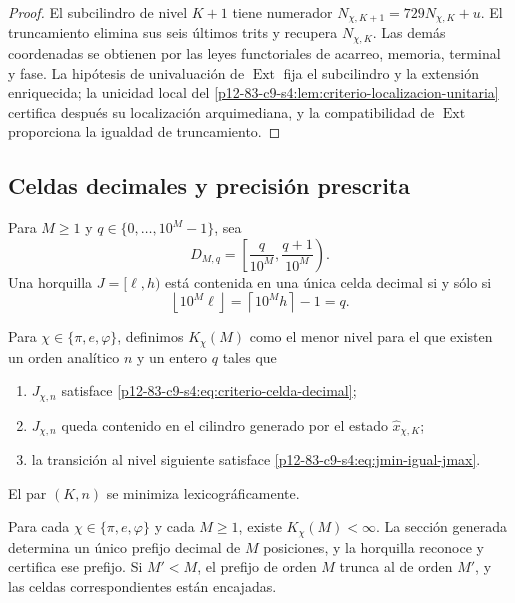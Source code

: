 \begin{proof}
El subcilindro de nivel \(K+1\) tiene numerador
\(N_{\chi,K+1}=729N_{\chi,K}+u\). El truncamiento elimina sus seis últimos
trits y recupera \(N_{\chi,K}\). Las demás coordenadas se obtienen por las
leyes functoriales de acarreo, memoria, terminal y fase. La hipótesis de
univaluación de \(\operatorname{Ext}\) fija el subcilindro y la extensión
enriquecida; la unicidad local del
\cref{p12-83-c9-s4:lem:criterio-localizacion-unitaria} certifica después su
localización arquimediana, y la compatibilidad de \(\operatorname{Ext}\)
proporciona la igualdad de truncamiento.
\end{proof}

\subsection{Celdas decimales y precisión prescrita}

Para \(M\geq1\) y \(q\in\{0,\ldots,10^M-1\}\), sea
\[
 D_{M,q}=
 \left[
 \frac{q}{10^M},
 \frac{q+1}{10^M}
 \right).
\]
Una horquilla \(J=[\ell,h)\) está contenida en una única celda decimal si
y sólo si
\begin{equation}
 \boxed{
 \left\lfloor10^M\ell\right\rfloor
 =\left\lceil10^Mh\right\rceil-1=q.}
 \label{p12-83-c9-s4:eq:criterio-celda-decimal}
\end{equation}

\begin{definition}
Para \(\chi\in\{\pi,e,\varphi\}\), definimos \(K_\chi(M)\) como el menor
nivel para el que existen un orden analítico \(n\) y un entero \(q\) tales
que
\begin{enumerate}
 \item \(J_{\chi,n}\) satisface
       \eqref{p12-83-c9-s4:eq:criterio-celda-decimal};
 \item \(J_{\chi,n}\) queda contenido en el cilindro generado por el
       estado \(\widehat x_{\chi,K}\);
 \item la transición al nivel siguiente satisface
       \eqref{p12-83-c9-s4:eq:jmin-igual-jmax}.
\end{enumerate}
El par \((K,n)\) se minimiza lexicográficamente.
\end{definition}

\begin{theorem}
\label{p12-83-c9-s4:thm:precision-decimal-arbitraria}
Para cada \(\chi\in\{\pi,e,\varphi\}\) y cada \(M\geq1\), existe
\(K_\chi(M)<\infty\). La sección generada determina un único prefijo decimal
de \(M\) posiciones, y la horquilla reconoce y certifica ese prefijo. Si
\(M'<M\), el prefijo de orden \(M\) trunca al de
orden \(M'\), y las celdas correspondientes están encajadas.
\end{theorem}

